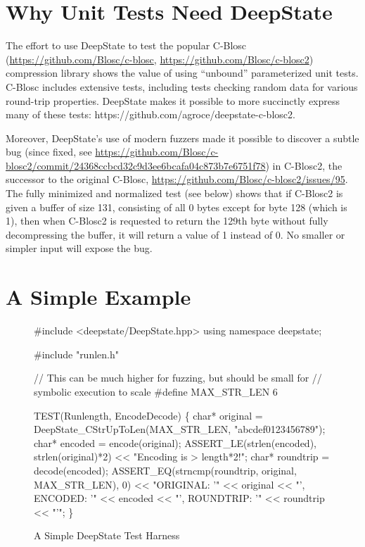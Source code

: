 \documentclass[sigconf]{acmart}
\begin{document}
\section{Why Unit Tests Need DeepState}

The effort to use DeepState to test the popular C-Blosc (\url{https://github.com/Blosc/c-blosc}, \url{https://github.com/Blosc/c-blosc2}) compression library shows the value of using ``unbound'' parameterized unit tests.  C-Blosc includes extensive tests, including tests checking random data for various round-trip properties.  DeepState makes it possible to more succinctly express many of these tests: https://github.com/agroce/deepstate-c-blosc2.

Moreover, DeepState's use of modern fuzzers made it possible to discover a subtle bug (since fixed, see \url{https://github.com/Blosc/c-blosc2/commit/24368ccbcd32c9d3ee6bcafa04c873b7e6751f78}) in C-Blosc2, the successor to the original C-Blosc, \url{https://github.com/Blosc/c-blosc2/issues/95}.  The fully minimized and normalized test (see below) shows that if C-Blosc2 is given a buffer of size 131, consisting of all 0 bytes except for byte 128 (which is 1), then when C-Blosc2 is requested to return the 129th byte without fully decompressing the buffer, it will return a value of 1 instead of 0.  No smaller or simpler input will expose the bug.

\section{A Simple Example}

\begin{figure}
{\scriptsize
\begin{code}
\#include <deepstate/DeepState.hpp>
using namespace deepstate;

\#include  "runlen.h"

// This can be much higher for fuzzing, but should be small for
// symbolic execution to scale
\#define MAX\_STR\_LEN 6

TEST(Runlength, EncodeDecode) \{
  char* original = DeepState\_CStrUpToLen(MAX\_STR\_LEN,
                                         "abcdef0123456789");
  char* encoded = encode(original);
  ASSERT\_LE(strlen(encoded), strlen(original)*2) <<
   "Encoding is > length*2!";
  char* roundtrip = decode(encoded);
  ASSERT\_EQ(strncmp(roundtrip, original, MAX\_STR\_LEN), 0) <<
    "ORIGINAL: '" << original << "', ENCODED: '" << encoded <<
    "', ROUNDTRIP: '" << roundtrip << "'";
\}
\end{code}
}
  \caption{A Simple DeepState Test Harness}
  \label{fig:example}
  \end{figure}
\end{document}
